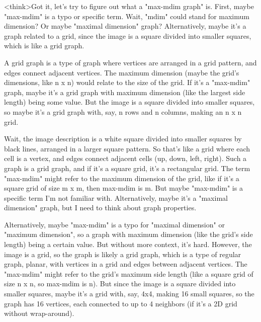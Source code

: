 <think>Got it, let's try to figure out what a "max-mdim graph" is. First, maybe "max-mdim" is a typo or specific term. Wait, "mdim" could stand for maximum dimension? Or maybe "maximal dimension" graph? Alternatively, maybe it's a graph related to a grid, since the image is a square divided into smaller squares, which is like a grid graph. 

A grid graph is a type of graph where vertices are arranged in a grid pattern, and edges connect adjacent vertices. The maximum dimension (maybe the grid's dimensions, like n x n) would relate to the size of the grid. If it's a "max-mdim" graph, maybe it's a grid graph with maximum dimension (like the largest side length) being some value. But the image is a square divided into smaller squares, so maybe it's a grid graph with, say, n rows and n columns, making an n x n grid. 

Wait, the image description is a white square divided into smaller squares by black lines, arranged in a larger square pattern. So that's like a grid where each cell is a vertex, and edges connect adjacent cells (up, down, left, right). Such a graph is a grid graph, and if it's a square grid, it's a rectangular grid. The term "max-mdim" might refer to the maximum dimension of the grid, like if it's a square grid of size m x m, then max-mdim is m. But maybe "max-mdim" is a specific term I'm not familiar with. Alternatively, maybe it's a "maximal dimension" graph, but I need to think about graph properties. 

Alternatively, maybe "max-mdim" is a typo for "maximal dimension" or "maximum dimension", so a graph with maximum dimension (like the grid's side length) being a certain value. But without more context, it's hard. However, the image is a grid, so the graph is likely a grid graph, which is a type of regular graph, planar, with vertices in a grid and edges between adjacent vertices. The "max-mdim" might refer to the grid's maximum side length (like a square grid of size n x n, so max-mdim is n). But since the image is a square divided into smaller squares, maybe it's a grid with, say, 4x4, making 16 small squares, so the graph has 16 vertices, each connected to up to 4 neighbors (if it's a 2D grid without wrap-around). 

